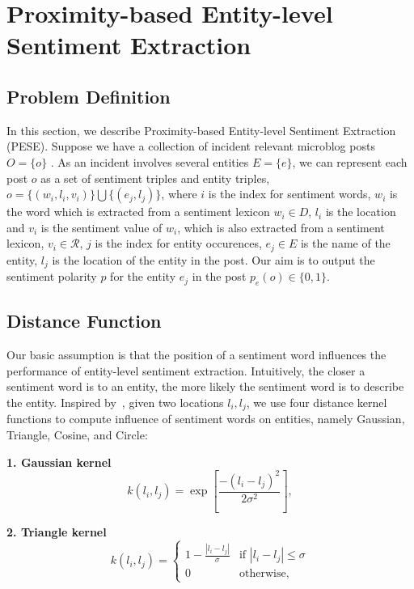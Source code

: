 \documentclass[runningheads]{llncs}
\begin{document}
\section{Proximity-based Entity-level Sentiment Extraction}\label{sec:sentiment classification}


\subsection{Problem Definition}
In this section, we describe Proximity-based Entity-level Sentiment Extraction (PESE). Suppose we have a collection of incident relevant microblog posts $O=\{o\}$ . As an incident involves several entities $E=\{e\}$, we can represent each post $o$ as a set of sentiment triples and entity triples, $o=\{(w_i,l_i,v_i)\}\bigcup \{(e_j,l_j)\}$, where $i$ is the index for sentiment words, $w_i$ is the word which is extracted from a sentiment lexicon $w_i\in D$,  $l_i$  is the location and $v_i$ is the sentiment value of $w_i$, which is also extracted from a sentiment lexicon, $v_i \in \mathcal{R}$,  $j$ is the index for entity occurences, $e_j\in E$ is the name of the entity, $l_j$ is the location of the entity in the post. Our aim is to output the sentiment polarity $p$ for the entity $e_j$ in the post $p_e(o)\in\{0,1\}$.
\vspace{-0.6cm}
\subsection{Distance Function}

Our basic assumption is that the position of a sentiment word influences the performance of entity-level sentiment extraction. Intuitively, the closer a sentiment word is to an entity, the more likely the sentiment word is to describe the entity. Inspired by~\cite{Lv2009distancefunction}, given two locations $l_i,l_j$, we use four distance kernel functions to compute influence of sentiment words on entities, namely Gaussian, Triangle, Cosine, and Circle:

\textbf{1. Gaussian kernel}
\begin{equation}
    k(l_i,l_j) = \exp\left[\frac{-(l_i-l_j)^2}{2\sigma^2}\right],
\end{equation}

\textbf{2. Triangle kernel}
\begin{equation}
k(l_i,l_j)=\begin{cases}
1-\frac{|l_i-l_j|}{\sigma} &\mbox{if $|l_i-l_j|\leq \sigma$}\\
0 &\mbox{otherwise},
\end{cases}
\end{equation}
\end{document}
